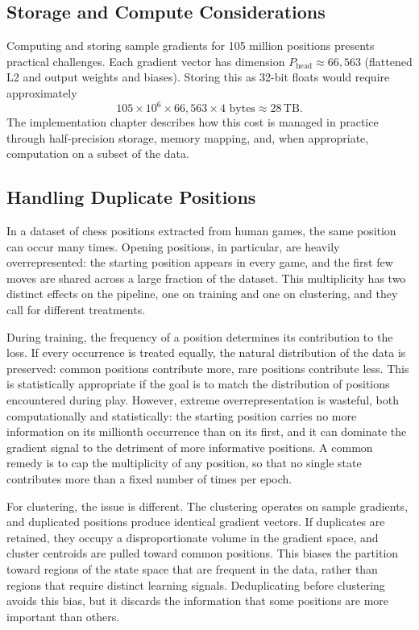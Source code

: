 \subsection{Storage and Compute Considerations}\label{sec:sg-storage}

Computing and storing sample gradients for 105 million positions presents practical challenges. Each gradient vector has dimension \(P_{\mathrm{head}} \approx 66{,}563\) (flattened L2 and output weights and biases). Storing this as 32-bit floats would require approximately
\[
105 \times 10^{6} \times 66{,}563 \times 4 \text{ bytes} \approx 28\,\mathrm{TB}.
\]
The implementation chapter describes how this cost is managed in practice through half-precision storage, memory mapping, and, when appropriate, computation on a subset of the data.

\subsection{Handling Duplicate Positions}\label{sec:duplicates}

In a dataset of chess positions extracted from human games, the same position can occur many times. Opening positions, in particular, are heavily overrepresented: the starting position appears in every game, and the first few moves are shared across a large fraction of the dataset. This multiplicity has two distinct effects on the pipeline, one on training and one on clustering, and they call for different treatments.

During training, the frequency of a position determines its contribution to the loss. If every occurrence is treated equally, the natural distribution of the data is preserved: common positions contribute more, rare positions contribute less. This is statistically appropriate if the goal is to match the distribution of positions encountered during play. However, extreme overrepresentation is wasteful, both computationally and statistically: the starting position carries no more information on its millionth occurrence than on its first, and it can dominate the gradient signal to the detriment of more informative positions. A common remedy is to cap the multiplicity of any position, so that no single state contributes more than a fixed number of times per epoch.

For clustering, the issue is different. The clustering operates on sample gradients, and duplicated positions produce identical gradient vectors. If duplicates are retained, they occupy a disproportionate volume in the gradient space, and cluster centroids are pulled toward common positions. This biases the partition toward regions of the state space that are frequent in the data, rather than regions that require distinct learning signals. Deduplicating before clustering avoids this bias, but it discards the information that some positions are more important than others.

